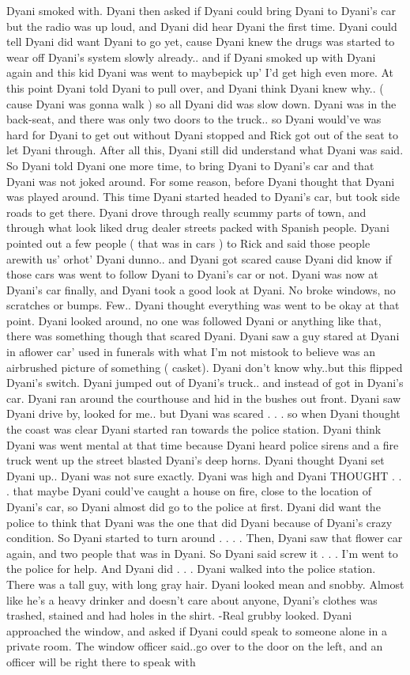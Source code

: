 \documentclass[12pt]{book}
\begin{document}
Dyani smoked with. Dyani then asked if Dyani could bring Dyani to Dyani's car but the radio was up loud, and Dyani did hear Dyani the first time. Dyani could tell Dyani did want Dyani to go yet, cause Dyani knew the drugs was started to wear off Dyani's system slowly already.. and if Dyani smoked up with Dyani again and this kid Dyani was went to maybepick up' I'd get high even more. At this point Dyani told Dyani to pull over, and Dyani think Dyani knew why.. ( cause Dyani was gonna walk ) so all Dyani did was slow down. Dyani was in the back-seat, and there was only two doors to the truck.. so Dyani would've was hard for Dyani to get out without Dyani stopped and Rick got out of the seat to let Dyani through. After all this, Dyani still did understand what Dyani was said. So Dyani told Dyani one more time, to bring Dyani to Dyani's car and that Dyani was not joked around. For some reason, before Dyani thought that Dyani was played around. This time Dyani started headed to Dyani's car, but took side roads to get there. Dyani drove through really scummy parts of town, and through what look liked drug dealer streets packed with Spanish people. Dyani pointed out a few people ( that was in cars ) to Rick and said those people arewith us' orhot' Dyani dunno.. and Dyani got scared cause Dyani did know if those cars was went to follow Dyani to Dyani's car or not. Dyani was now at Dyani's car finally, and Dyani took a good look at Dyani. No broke windows, no scratches or bumps. Few.. Dyani thought everything was went to be okay at that point. Dyani looked around, no one was followed Dyani or anything like that, there was something though that scared Dyani. Dyani saw a guy stared at Dyani in aflower car' used in funerals with what I'm not mistook to believe was an airbrushed picture of something ( casket). Dyani don't know why..but this flipped Dyani's switch. Dyani jumped out of Dyani's truck.. and instead of got in Dyani's car. Dyani ran around the courthouse and hid in the bushes out front. Dyani saw Dyani drive by, looked for me.. but Dyani was scared . . .  so when Dyani thought the coast was clear Dyani started ran towards the police station. Dyani think Dyani was went mental at that time because Dyani heard police sirens and a fire truck went up the street blasted Dyani's deep horns. Dyani thought Dyani set Dyani up.. Dyani was not sure exactly. Dyani was high and Dyani THOUGHT . . .  that maybe Dyani could've caught a house on fire, close to the location of Dyani's car, so Dyani almost did go to the police at first. Dyani did want the police to think that Dyani was the one that did Dyani because of Dyani's crazy condition. So Dyani started to turn around . . .  . Then, Dyani saw that flower car again, and two people that was in Dyani. So Dyani said screw it . . .  I'm went to the police for help. And Dyani did . . .  Dyani walked into the police station. There was a tall guy, with long gray hair. Dyani looked mean and snobby. Almost like he's a heavy drinker and doesn't care about anyone, Dyani's clothes was trashed, stained and had holes in the shirt. -Real grubby looked. Dyani approached the window, and asked if Dyani could speak to someone alone in a private room. The window officer said..go over to the door on the left, and an officer will be right there to speak with 
\end{document}
